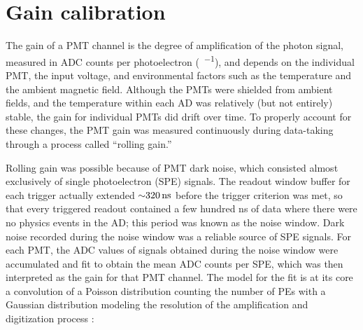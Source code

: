 \section{Gain calibration}
\label{sec:gain}

The gain of a PMT channel is the degree of amplification
of the photon signal,
measured in ADC counts per photoelectron (\si{\adc\per\pe}),
and depends on the individual PMT, the input voltage,
and environmental factors such as the temperature
and the ambient magnetic field.
Although the PMTs were shielded from ambient fields,
and the temperature within each AD was relatively (but not entirely) stable,
the gain for individual PMTs did drift over time.
To properly account for these changes,
the PMT gain was measured continuously during data-taking
through a process called ``rolling gain.''

Rolling gain was possible because of PMT dark noise,
which consisted almost exclusively of single photoelectron (SPE) signals.
The readout window buffer for each trigger actually extended $\SI{\sim320}{\ns}$
before the trigger criterion was met,
so that every triggered readout contained a few hundred \si{\ns}
of data where there were no physics events in the AD;
this period was known as the noise window.
Dark noise recorded during the noise window was a reliable source
of SPE signals.
For each PMT, the ADC values of signals obtained during the noise window
were accumulated and fit to obtain the mean ADC counts per SPE,
which was then interpreted as the gain for that PMT channel.
The model for the fit is at its core a convolution of
a Poisson distribution counting the number of PEs
with a Gaussian distribution modeling the resolution of
the amplification and digitization process \cite{spe_calib}:

